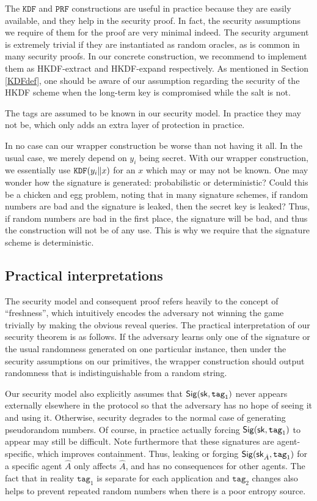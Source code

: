 \documentclass{article}
\begin{document}
The $\texttt{KDF}$ and $\texttt{PRF}$ constructions are useful in practice because they are easily available, and they help in the security proof. In fact, the security assumptions we require of them for the proof are very minimal indeed. The security argument is extremely trivial if they are instantiated as random oracles, as is common in many security proofs. In our concrete construction, we recommend to implement them as HKDF-extract and HKDF-expand respectively. As mentioned in Section \ref{KDFdef}, one should be aware of our assumption regarding the security of the HKDF scheme when the long-term key is compromised while the salt is not.

The tags are assumed to be known in our security model. In practice they may not be, which only adds an extra layer of protection in practice.

In no case can our wrapper construction be worse than not having it all. In the usual case, we merely depend on $y_i$ being secret. With our wrapper construction, we essentially use $\texttt{KDF}(y_i \| x)$ for an $x$ which may or may not be known. One may wonder how the signature is generated: probabilistic or deterministic? Could this be a chicken and egg problem, noting that in many signature schemes, if random numbers are bad and the signature is leaked, then the secret key is leaked? Thus, if random numbers are bad in the first place, the signature will be bad, and thus the construction will not be of any use. This is why we require that the signature scheme is deterministic.

\subsection{Practical interpretations}
The security model and consequent proof refers heavily to the concept of ``freshness'', which intuitively encodes the adversary not winning the game trivially by making the obvious reveal queries. The practical interpretation of our security theorem is as follows. If the adversary learns only one of the signature or the usual randomness generated on one particular instance, then under the security assumptions on our primitives, the wrapper construction should output randomness that is indistinguishable from a random string.

Our security model also explicitly assumes that $\mathsf{Sig} (\mathsf{sk}, \texttt{tag}_1)$ never appears externally elsewhere in
the protocol so that the adversary has no hope of seeing it and using it. Otherwise, security degrades to the normal case of generating pseudorandom numbers. Of course, in practice actually
forcing $\mathsf{Sig} (\mathsf{sk}, \texttt{tag}_1)$ to appear may still be difficult.  Note furthermore that these
signatures are agent-specific, which improves containment. Thus, leaking
or forging $\mathsf{Sig} (\mathsf{sk}_{\hat A}, \texttt{tag}_1)$ for a specific agent $\hat A$ only affects $\hat A$, and
has no consequences for other agents.  The fact that in reality $\texttt{tag}_1$ is separate for each application and $\texttt{tag}_2$ changes also helps to prevent repeated random numbers when there is a poor entropy source. 



\end{document}
